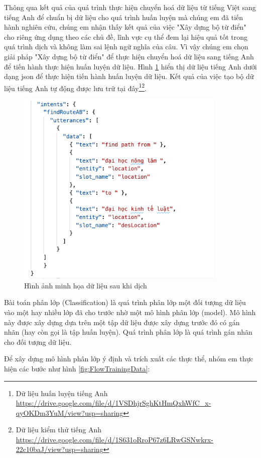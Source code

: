 Thông qua kết quả của quá trình thực hiện chuyển hoá dữ liệu từ tiếng Việt sang tiếng Anh để chuẩn bị dữ liệu cho quá trình huấn luyện mà chúng em đã tiến hành nghiên cứu, chúng em nhận thấy kết quả của việc "Xây dựng bộ từ điển" cho riêng ứng dụng theo các chủ đề, lĩnh vực cụ thể đem lại hiệu quả tốt trong quá trình dịch và không làm sai lệnh ngữ nghĩa của câu. Vì vậy chúng em chọn giải pháp "Xây dựng bộ từ điển" để thực hiện chuyển hoá dữ liệu sang tiếng Anh để tiến hành thực hiện huấn luyện dữ liệu. Hình \ref{fig:data-train-en} hiển thị dữ liệu tiếng Anh dưới dạng json để thực hiện tiến hành huấn luyện dữ liệu. Kết quả của việc tạo bộ dữ liệu tiếng Anh tự động được lưu trữ tại đây\footnote{Dữ liệu huấn luyện tiếng Anh \url{https://drive.google.com/file/d/1VSDhjrSghKtHmQxhWfC_x-qyOKDm3YuM/view?usp=sharing}}\footnote{Dữ liệu kiểm thử tiếng Anh \url{https://drive.google.com/file/d/1S631oRroP67z6LRwGSNwkrx-22c10baJ/view?usp=sharing}}.

\begin{figure}[H]
    \centering
    \includegraphics[width=10cm]{images/Data-train-ex.png}
    \caption{Hình ảnh minh họa dữ liệu sau khi dịch}
    \label{fig:data-train-en} 
\end{figure}


Bài toán phân lớp (Classification) là quá trình phân lớp một đối tượng dữ liệu vào một hay nhiều lớp đã cho trước nhờ một mô hình phân lớp (model). Mô hình này được xây dựng dựa trên một tập dữ liệu được xây dựng trước đó có gán nhãn (hay còn gọi là tập huấn luyện). Quá trình phân lớp là quá trình gán nhãn cho đối tượng dữ liệu.



Để xây dựng mô hình phân lớp ý định và trích xuất các thực thể, nhóm em thực hiện các bước như hình \ref{fig:FlowTrainingData}:

